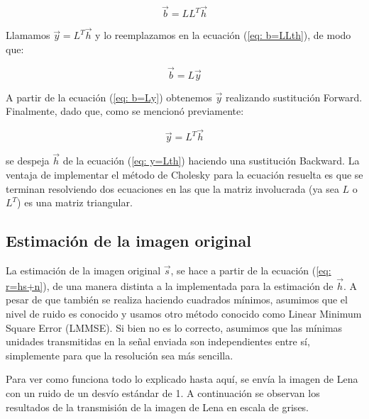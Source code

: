 \begin{equation} 
\vec{b} = L L^T \vec{h} 
\label{eq: b=LLth}
\end{equation} 

Llamamos $\vec{y} = L^T \vec{h}$ y lo reemplazamos en la ecuaci\'on (\ref{eq: b=LLth}), de modo que:

\begin{equation} 
\vec{b} = L \vec{y}
\label{eq: b=Ly}
\end{equation} 

A partir de la ecuaci\'on (\ref{eq: b=Ly}) obtenemos $ \vec{y}$ realizando sustituci\'on Forward. Finalmente, dado que, como se mencion\'o previamente:

 \begin{equation} 
\vec{y} = L^T \vec{h} 
\label{eq: y=Lth}
\end{equation}

se despeja $\vec{h}$ de la ecuaci\'on (\ref{eq: y=Lth}) haciendo una sustituci\'on Backward. La ventaja de implementar el m\'etodo de Cholesky para la ecuaci\'on resuelta es que se terminan resolviendo dos ecuaciones en las que la matriz involucrada (ya sea $L$ o $L^T$) es una matriz triangular.

\subsection{Estimaci\'on de la imagen original}

La estimaci\'on de la imagen original $\vec{s}$, se hace a partir de la ecuaci\'on (\ref{eq: r=hs+n}), de una manera distinta a la implementada para la estimaci\'on de  $\vec{h}$. A pesar de que tambi\'en se realiza haciendo cuadrados m\'inimos, asumimos que el nivel de ruido es conocido y usamos otro m\'etodo  conocido como Linear Minimum Square Error (LMMSE). Si bien no es lo correcto, asumimos que las m\'inimas unidades transmitidas en la se\~nal enviada son independientes entre s\'i, simplemente para que la resoluci\'on sea m\'as sencilla. 


Para ver como funciona todo lo explicado hasta aqu\'i, se env\'ia la imagen de Lena con un ruido de un desv\'io est\'andar de 1. A continuaci\'on se observan los resultados de la transmisi\'on de la imagen de Lena en escala de grises.
 

